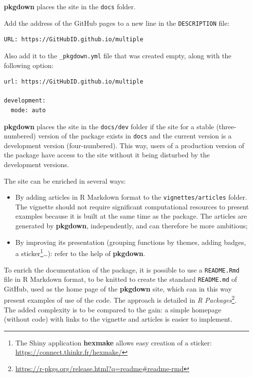 \documentclass[
  12pt,
  american,
  a4paper,
  extrafontsizes,onecolumn,openright
  ]{memoir}
\providecommand{\tightlist}{%
  \setlength{\itemsep}{0pt}\setlength{\parskip}{0pt}}
\begin{document}
\textbf{pkgdown} places the site in the \texttt{docs} folder.

Add the address of the GitHub pages to a new line in the \texttt{DESCRIPTION} file:

\begin{verbatim}
URL: https://GitHubID.github.io/multiple
\end{verbatim}

Also add it to the \texttt{\_pkgdown.yml} file that was created empty, along with the following option:

\begin{verbatim}
url: https://GitHubID.github.io/multiple

development:
  mode: auto
\end{verbatim}

\textbf{pkgdown} places the site in the \texttt{docs/dev} folder if the site for a stable (three-numbered) version of the package exists in \texttt{docs} and the current version is a development version (four-numbered).
This way, users of a production version of the package have access to the site without it being disturbed by the development versions.

The site can be enriched in several ways:

\begin{itemize}
\tightlist
\item
  By adding articles in R Markdown format to the \texttt{vignettes/articles} folder.
  The vignette should not require significant computational resources to present examples because it is built at the same time as the package.
  The articles are generated by \textbf{pkgdown}, independently, and can therefore be more ambitious;
\item
  By improving its presentation (grouping functions by themes, adding badges, a sticker\footnote{The Shiny application \textbf{hexmake} allows easy creation of a sticker: \url{https://connect.thinkr.fr/hexmake/}}\ldots): refer to the help of \textbf{pkgdown}.
\end{itemize}

To enrich the documentation of the package, it is possible to use a \texttt{README.Rmd} file in R Markdown format, to be knitted to create the standard \texttt{README.md} of GitHub, used as the home page of the \textbf{pkgdown} site, which can in this way present examples of use of the code.
The approach is detailed in \emph{R Packages}\footnote{\url{https://r-pkgs.org/release.html?q=readme\#readme-rmd}}.
The added complexity is to be compared to the gain: a simple homepage (without code) with links to the vignette and articles is easier to implement.
\end{document}

